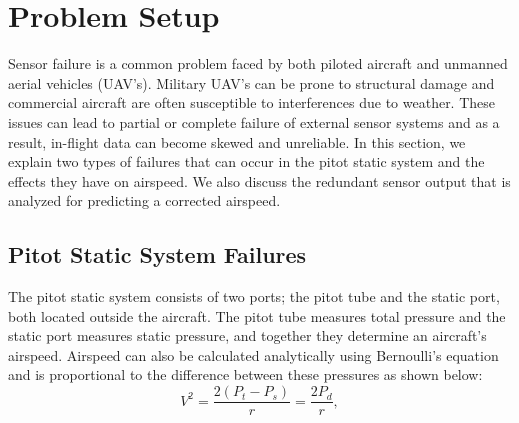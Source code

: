 \documentclass[]{aiaa-tc}
\begin{document}
\section{Problem Setup}
\label{sec:problem setup}
Sensor failure is a common problem faced by both piloted aircraft and unmanned aerial vehicles (UAV's). Military UAV's can be prone to structural damage and commercial aircraft are often susceptible to interferences due to weather. These issues can lead to partial or complete failure of external sensor systems and as a result, in-flight data can become skewed and unreliable. In this section, we explain two types of failures that can occur in the pitot static system and the effects they have on airspeed. We also discuss the redundant sensor output that is analyzed for predicting a corrected airspeed. 

\subsection{Pitot Static System Failures}
The pitot static system consists of two ports; the pitot tube and the static port, both located outside the aircraft. The pitot tube measures total pressure and the static port measures static pressure, and together they determine an aircraft's airspeed.  Airspeed can also be calculated analytically using Bernoulli's equation and is proportional to the difference between these pressures as shown below:
\begin{equation}
\label{bern}
V^2 = \frac{2(P_t - P_s)}{r} = \frac{2P_d}{r},
\end{equation}
\end{document}
